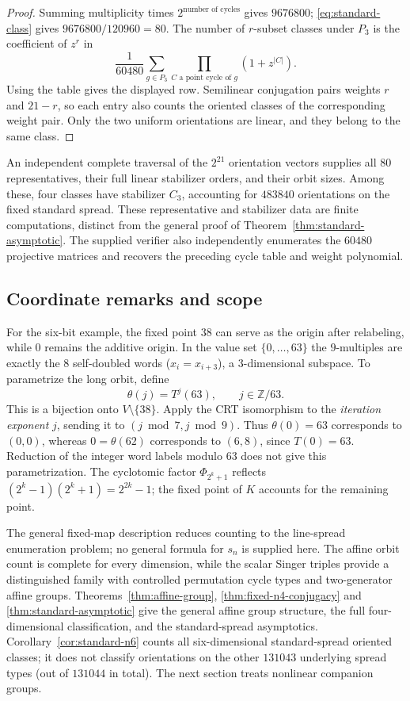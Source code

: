 \documentclass[11pt]{article}
\begin{document}
\begin{proof}
Summing multiplicity times $2^{\text{number of cycles}}$ gives $9676800$;
\eqref{eq:standard-class} gives $9676800/120960=80$.
The number of $r$-subset classes under $P_3$ is the coefficient of $z^r$ in
\[
\frac{1}{60480}\sum_{g\in P_3}
       \prod_{C\text{ a point cycle of }g}(1+z^{|C|}).
\]
Using the table gives the displayed row. Semilinear conjugation pairs
weights $r$ and $21-r$, so each entry also counts the oriented classes
of the corresponding weight pair. Only the two uniform orientations are
linear, and they belong to the same class.
\end{proof}

An independent complete traversal of the $2^{21}$ orientation vectors
supplies all $80$ representatives, their full linear stabilizer orders,
and their orbit sizes. Among these, four classes have stabilizer $C_3$,
accounting for $483840$ orientations on the fixed standard spread.
These representative and stabilizer data are finite computations, distinct
from the general proof of Theorem~\ref{thm:standard-asymptotic}.
The supplied verifier also independently enumerates the $60480$ projective
matrices and recovers the preceding cycle table and weight polynomial.

\subsection*{Coordinate remarks and scope}
For the six-bit example, the fixed point $38$ can serve as the origin after
relabeling, while $0$ remains the additive origin.
In the value set $\{0,\dots,63\}$ the $9$-multiples are exactly the $8$
self-doubled words ($x_i=x_{i+3}$), a $3$-dimensional subspace.
To parametrize the long orbit, define
\[
\theta(j)=T^j(63),\qquad j\in\mathbb Z/63.
\]
This is a bijection onto $V\setminus\{38\}$. Apply the CRT isomorphism to the
\emph{iteration exponent} $j$, sending it to $(j\bmod7,j\bmod9)$.
Thus $\theta(0)=63$ corresponds to $(0,0)$, whereas
$0=\theta(62)$ corresponds to $(6,8)$, since $T(0)=63$.
Reduction of the integer word labels modulo $63$ does not give this parametrization.
The cyclotomic factor $\Phi_{2^k+1}$ reflects
$(2^k-1)(2^k+1)=2^{2k}-1$; the fixed point of $K$ accounts for the remaining point.

The general fixed-map description reduces counting to the line-spread
enumeration problem; no general formula for $s_n$ is supplied here.
The affine orbit count is complete for every dimension, while the scalar
Singer triples provide a distinguished family with controlled permutation
cycle types and two-generator affine groups. Theorems~\ref{thm:affine-group}, \ref{thm:fixed-n4-conjugacy} and
\ref{thm:standard-asymptotic} give the general affine group structure,
the full four-dimensional classification, and the standard-spread
asymptotics. Corollary~\ref{cor:standard-n6} counts all six-dimensional
standard-spread oriented classes; it does not classify orientations on
the other $131043$ underlying spread types (out of $131044$ in total).
The next section treats nonlinear companion groups.
\end{document}

